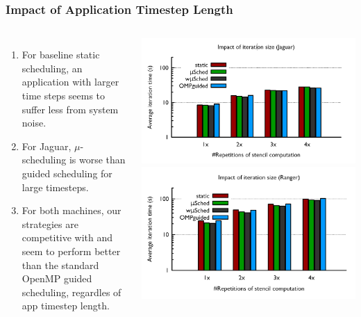 \begin{frame}
\frametitle{Impact of Application Timestep Length}
\begin{columns}
\begin{enumerate}
\tiny \item \tiny For baseline static scheduling, an application with larger time steps
seems to suffer less from system noise. 
\item \tiny For Jaguar, $\mu$-scheduling is worse than guided
  scheduling for large timesteps. 
\item \tiny For both machines, our strategies are competitive with and seem to perform
  better than the standard OpenMP guided scheduling, regardles of  app
  timestep length.  %
\end{enumerate} 
\includegraphics[width=\textwidth]{images/iterSizeImpact-Jaguar}
\includegraphics[width=\textwidth]{images/iterSizeImpact-Ranger}
\end{columns} 
\end{frame} 


